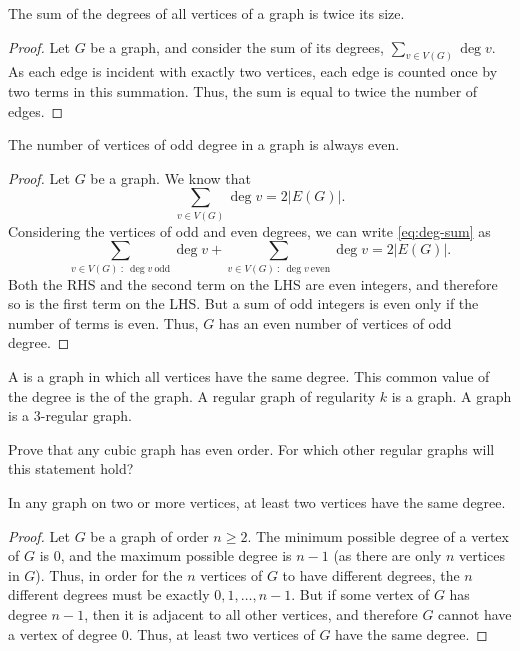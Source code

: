 \begin{Lemma}
The sum of the degrees of all vertices of a graph is twice its size.
\end{Lemma}

\begin{proof}
Let $G$ be a graph, and consider the sum of its degrees, $\sum_{v \in V(G)} \deg v$. As each edge is incident with exactly two vertices, each edge is counted once by two terms in this summation. Thus, the sum is equal to twice the number of edges.
\end{proof}

\begin{Corollary}
The number of vertices of odd degree in a graph is always even.
\end{Corollary}

\begin{proof}
Let $G$ be a graph. We know that
\begin{equation}
\sum_{v \in V(G)} \deg v = 2 |E(G)|. \label{eq:deg-sum}
\end{equation}
Considering the vertices of odd and even degrees, we can write \eqref{eq:deg-sum} as
\begin{equation}
\sum_{v \in V(G) ~:~ \deg v\ \text{odd}} \deg v + \sum_{v \in V(G) ~:~ \deg v\ \text{even}} \deg v = 2 |E(G)|.
\end{equation}
Both the RHS and the second term on the LHS are even integers, and therefore so is the first term on the LHS. But a sum of odd integers is even only if the number of terms is even. Thus, $G$ has an even number of vertices of odd degree.
\end{proof}

A  is a graph in which all vertices have the same degree. This common value of the degree is the  of the graph. A regular graph of regularity $k$ is a  graph. A  graph is a $3$-regular graph.

\begin{Exercise}
Prove that any cubic graph has even order. For which other regular graphs will this statement hold?
\end{Exercise}

\begin{Theorem}
In any graph on two or more vertices, at least two vertices have the same degree.
\end{Theorem}

\begin{proof}
Let $G$ be a graph of order $n \ge 2$. The minimum possible degree of a vertex of $G$ is $0$, and the maximum possible degree is $n - 1$ (as there are only $n$ vertices in $G$). Thus, in order for the $n$ vertices of $G$ to have different degrees, the $n$ different degrees must be exactly $0, 1, \ldots, n - 1$. But if some vertex of $G$ has degree $n - 1$, then it is adjacent to all other vertices, and therefore $G$ cannot have a vertex of degree $0$. Thus, at least two vertices of $G$ have the same degree.
\end{proof}

